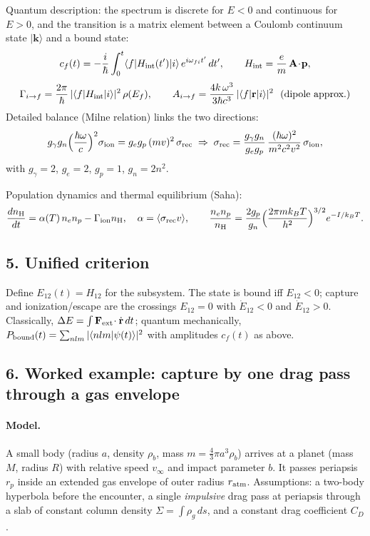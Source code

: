 \documentclass{article}
\begin{document}
Quantum description: the spectrum is discrete for $E<0$ and continuous for $E>0$, and the transition is a
matrix element between a Coulomb continuum state $|\mathbf k\rangle$ and a bound state:
\begin{equation}
c_f(t)=-\frac{i}{\hbar}\int_0^{t}\langle f|H_{\rm int}(t')|i\rangle\,
e^{i\omega_{fi}t'}\,dt',\qquad
H_{\rm int}=\frac{e}{m}\,\mathbf A\!\cdot\!\mathbf p,
\end{equation}
\begin{equation}
\Gamma_{i\to f}=\frac{2\pi}{\hbar}\,|\langle f|H_{\rm int}|i\rangle|^{2}\,\rho(E_f),
\qquad
A_{i\to f}=\frac{4k\,\omega^{3}}{3\hbar c^{3}}\,|\langle f|\mathbf r|i\rangle|^{2}
\ \ \text{(dipole approx.)}
\end{equation}
Detailed balance (Milne relation) links the two directions:
\begin{equation}
g_\gamma g_n\Big(\frac{\hbar\omega}{c}\Big)^{2}\sigma_{\rm ion}
= g_e g_p\,(mv)^{2}\,\sigma_{\rm rec}
\;\Rightarrow\;
\sigma_{\rm rec}=\frac{g_\gamma g_n}{g_e g_p}\,
\frac{(\hbar\omega)^{2}}{m^{2}c^{2}v^{2}}\,\sigma_{\rm ion},
\end{equation}
with $g_\gamma=2$, $g_e=2$, $g_p=1$, $g_n=2n^2$.

Population dynamics and thermal equilibrium (Saha):
\begin{equation}
\frac{dn_{\rm H}}{dt}=\alpha(T)\,n_en_p-\Gamma_{\rm ion}n_{\rm H},\quad
\alpha=\langle\sigma_{\rm rec}v\rangle,\qquad
\frac{n_en_p}{n_{\rm H}}=\frac{2g_p}{g_n}
\Big(\frac{2\pi mk_BT}{h^{2}}\Big)^{3/2}e^{-I/k_BT}.
\end{equation}

\subsection*{5. Unified criterion}
Define $E_{12}(t)=H_{12}$ for the subsystem. The state is bound iff $E_{12}<0$;
capture and ionization/escape are the crossings $E_{12}=0$ with $\dot E_{12}<0$ and $\dot E_{12}>0$.
Classically, $\Delta E=\int\mathbf F_{\rm ext}\!\cdot\dot{\mathbf r}\,dt$;
quantum mechanically,
$P_{\rm bound}(t)=\sum_{nlm}|\langle nlm|\psi(t)\rangle|^{2}$ with
amplitudes $c_f(t)$ as above.

\subsection*{6. Worked example: capture by one drag pass through a gas envelope}

\paragraph{Model.}
A small body (radius $a$, density $\rho_b$, mass $m=\tfrac43\pi a^{3}\rho_b$) arrives at a planet
(mass $M$, radius $R$) with relative speed $v_\infty$ and impact parameter $b$.
It passes periapsis $r_p$ inside an extended gas envelope of outer radius $r_{\rm atm}$.
Assumptions: a two-body hyperbola before the encounter, a single \emph{impulsive}
drag pass at periapsis through a slab of constant column density $\Sigma=\int\rho_g\,ds$,
and a constant drag coefficient $C_D$.
\end{document}
